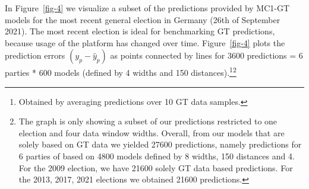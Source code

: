 \documentclass[
  letterpaper,
  DIV=11,
  numbers=noendperiod]{scrartcl}
\begin{document}
In Figure~\ref{fig-4} we visualize a subset of the predictions provided
by MC1-GT models for the most recent general election in Germany (26th
of September 2021). The most recent election is ideal for benchmarking
GT predictions, because usage of the platform has changed over time.
Figure~\ref{fig-4} plots the prediction errors \((y_{p}-\hat{y}_{p})\)
as points connected by lines for 3600 predictions = 6 parties * 600
models (defined by 4 widths and 150 distances).\footnote{Obtained by
  averaging predictions over 10 GT data samples.}\footnote{The graph is
  only showing a subset of our predictions restricted to one election
  and four data window widths. Overall, from our models that are solely
  based on GT data we yielded 27600 predictions, namely predictions for
  6 parties of based on 4800 models defined by 8 widths, 150 distances
  and 4. For the 2009 election, we have 21600 solely GT data based
  predictions. For the 2013, 2017, 2021 elections we obtained 21600
  predictions.}
\end{document}
